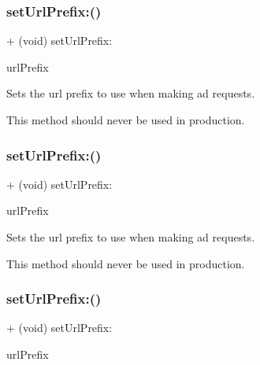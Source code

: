 \subsubsection{\texorpdfstring{set\+Url\+Prefix\+:()}{setUrlPrefix:()}\hspace{0.1cm}{\footnotesize\ttfamily [1/5]}}
{\footnotesize\ttfamily + (void) set\+Url\+Prefix\+: \begin{DoxyParamCaption}\item[{(N\+S\+String $\ast$)}]{url\+Prefix }\end{DoxyParamCaption}}

Sets the url prefix to use when making ad requests.

This method should never be used in production. \mbox{\label{interfaceFBAdSettings_aab1304a0308648520b5dc1fda60a944c}} 
\subsubsection{\texorpdfstring{set\+Url\+Prefix\+:()}{setUrlPrefix:()}\hspace{0.1cm}{\footnotesize\ttfamily [2/5]}}
{\footnotesize\ttfamily + (void) set\+Url\+Prefix\+: \begin{DoxyParamCaption}\item[{(N\+S\+String $\ast$)}]{url\+Prefix }\end{DoxyParamCaption}}

Sets the url prefix to use when making ad requests.

This method should never be used in production. \mbox{\label{interfaceFBAdSettings_aab1304a0308648520b5dc1fda60a944c}} 
\subsubsection{\texorpdfstring{set\+Url\+Prefix\+:()}{setUrlPrefix:()}\hspace{0.1cm}{\footnotesize\ttfamily [3/5]}}
{\footnotesize\ttfamily + (void) set\+Url\+Prefix\+: \begin{DoxyParamCaption}\item[{(N\+S\+String $\ast$)}]{url\+Prefix }\end{DoxyParamCaption}}


